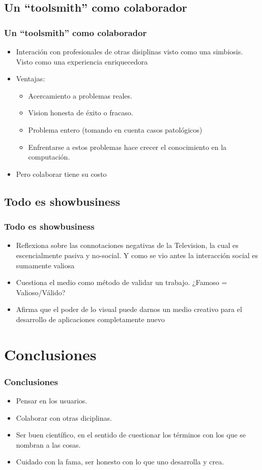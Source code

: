 \documentclass{beamer}
\begin{document}
  \subsection{Un ``toolsmith'' como colaborador}
    \begin{frame}
      \frametitle{Un ``toolsmith'' como colaborador}
	\begin{itemize}
       	    \item Interación con profesionales de otras disiplinas visto como una simbiosis. Visto como una experiencia enriquecedora
	    \item Ventajas:
	    \begin{itemize}
	    	\item Acercamiento a problemas reales.
	    	\item Vision honesta de \'exito o fracaso.
	    	\item Problema entero (tomando en cuenta casos patol\'ogicos)
	    	\item Enfrentarse a estos problemas hace crecer el conocimiento en la computaci\'on.
	    \end{itemize}
	    \item Pero colaborar tiene su costo
	  \end{itemize}
     \end{frame}

  \subsection{Todo es showbusiness}
    \begin{frame}
      \frametitle{Todo es showbusiness}
	\begin{itemize}
       	    \item Reflexiona sobre las connotaciones negativas de la Television, la cual es escencialmente pasiva y no-social. Y como se vio antes la interacción social es sumamente valiosa
	    \item Cuestiona el medio como método de validar un trabajo. ¿Famoso = Valioso/Válido?
	    \item Afirma que el poder de lo visual puede darnos un medio creativo para el desarrollo de aplicaciones completamente nuevo
	  \end{itemize}
     \end{frame}

    \section{Conclusiones}
      \begin{frame}
            \frametitle{Conclusiones}

       \begin{itemize}
       \item Pensar en los usuarios. 
	  \item Colaborar con otras diciplinas.
	  \item Ser buen científico, en el sentido de cuestionar los términos con los que se nombran a las cosas.
	  \item Cuidado con la fama, ser honesto con lo que uno desarrolla y crea.
	\end{itemize}  
    \end{frame}    
\end{document}
